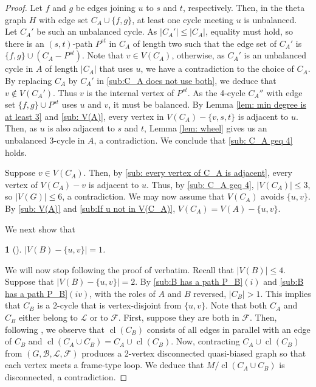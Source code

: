 \documentclass[12pt]{article}
\theoremstyle{definition}
\theoremstyle{plain} %
\newtheorem{subtheorem}{}[theorem]
\newcommand{\cB}{\mathcal{B}}
\newcommand{\cF}{\mathcal{F}}
\newcommand{\cL}{\mathcal{L}}
\DeclareMathOperator{\cl}{cl}
\newcommand{\qbg}{\ensuremath{(G,\cB,\cL,\cF)}}
\begin{document}
\begin{proof}
Let $f$ and $g$ be edges joining $u$ to $s$ and $t$, respectively. Then, in the
theta graph $H$ with edge set $C_A \cup \{f,g\}$, at least one cycle meeting $u$ is unbalanced.
Let $C_A'$ be such an unbalanced cycle. As $|C_A'| \le |C_A|$, equality must hold, so
there is an $(s,t)$-path $P^{st}$ in $C_A$ of length two such that the edge set of $C_A'$ is
$\{f,g\} \cup (C_A - P^{st})$. Note that $v \in V(C_A)$, otherwise, as $C_A'$ is an unbalanced
cycle in $A$ of length $|C_A|$ that uses $u$, we have a contradiction to the choice
of $C_A$. By replacing $C_A$ by $C_A'$ in \ref{sub:C_A does not use both}, we deduce that $v \notin V(C_A')$. Thus $v$
is the internal vertex of $P^{st}$. As the 4-cycle $C_A''$ with edge set $\{f,g\} \cup P^{st}$
uses $u$ and $v$, it must be balanced. By Lemma \ref{lem: min degree is at least 3} and \ref{sub: V(A)}, every vertex
in $V(C_A) - \{v,s,t\}$ is adjacent to $u$. Then, as $u$ is also adjacent to $s$ and
$t$, Lemma \ref{lem: wheel} gives us an unbalanced 3-cycle in $A$, a contradiction. We
conclude that \ref{sub: C_A geq 4} holds.

Suppose $v \in V(C_A)$. Then, by \ref{sub: every vertex of C_A is adjacent}, every vertex of $V(C_A) - v$ is adjacent
to $u$. Thus, by \ref{sub: C_A geq 4}, $|V(C_A)| \le 3$, so $|V(G)| \le 6$, a contradiction. We
may now assume that $V(C_A)$ avoids $\{u,v\}$. By \ref{sub: V(A)} and \ref{sub:If u not in V(C_A)}, $V(C_A) =
V(A) - \{u,v\}$. 

We next show that
\begin{subtheorem} [{\cite[3.5.9]{Fife-Mayhew-Oxley-Semple2020}}]\label{sub:V(B)}
    $\lvert V(B)-\{u,v\}\rvert=1$.
\end{subtheorem}
We will now stop following the proof of \cite[Theorem 3.5]{Fife-Mayhew-Oxley-Semple2020} verbatim. Recall that $\lvert V(B)\rvert\leq4.$ Suppose that $\lvert V(B)-\{u,v\}\rvert=2.$ By \ref{sub:B has a path P_B}$(i)$ and \ref{sub:B has a path P_B}$(iv)$, with the roles of $A$ and $B$ reversed, $\lvert C_B\rvert>1.$ This implies that $C_B$ is a 2-cycle that is vertex-disjoint from $\{u,v\}$. Note that both $C_A$ and $C_B$ either belong to $\cL$ or to $\cF$. First, suppose they are both in $\cF$. Then, following \cite{Fife-Mayhew-Oxley-Semple2020}, we observe that $\cl(C_B)$ consists of all edges in parallel with an edge of $C_B$ and $\cl(C_A\cup C_B)=C_A\cup \cl(C_B)$. Now, contracting $C_A\cup\cl(C_B)$ from $\qbg$ produces a 2-vertex disconnected quasi-biased graph so that each vertex meets a frame-type loop. We deduce that $M/\cl(C_A\cup C_B)$ is disconnected, a contradiction. 


\end{proof}
\end{document}
